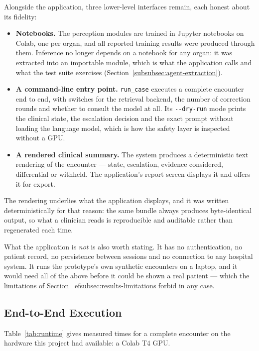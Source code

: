 Alongside the application, three lower-level interfaces remain, each honest about its fidelity:

\begin{itemize}
  \item \textbf{Notebooks.} The perception modules are trained in Jupyter notebooks on Colab,
        one per organ, and all reported training results were produced through them. Inference
        no longer depends on a notebook for any organ: it was extracted into an importable
        module, which is what the application calls and what the test suite exercises
        (Section~\ref{subsubsec:agent-extraction}).
  \item \textbf{A command-line entry point.} \texttt{run\_case} executes a complete encounter
        end to end, with switches for the retrieval backend, the number of correction rounds
        and whether to consult the model at all. Its \texttt{-{}-dry-run} mode prints the
        clinical state, the escalation decision and the exact prompt without loading the
        language model, which is how the safety layer is inspected without a GPU.
  \item \textbf{A rendered clinical summary.} The system produces a deterministic text
        rendering of the encounter --- state, escalation, evidence considered, differential or
        withheld. The application's report screen displays it and offers it for export.
\end{itemize}

The rendering underlies what the application displays, and it was written deterministically
for that reason: the same bundle always produces byte-identical output, so what a clinician
reads is reproducible and auditable rather than regenerated each time.

What the application is \emph{not} is also worth stating. It has no authentication, no patient
record, no persistence between sessions and no connection to any hospital system. It runs the
prototype's own synthetic encounters on a laptop, and it would need all of the above before it
could be shown a real patient --- which the limitations of Section~
ef{subsec:results-limitations}
forbid in any case.

\subsection{End-to-End Execution}
\label{subsec:integration-execution}

Table~\ref{tab:runtime} gives measured times for a complete encounter on the hardware this
project had available: a Colab T4 GPU.

